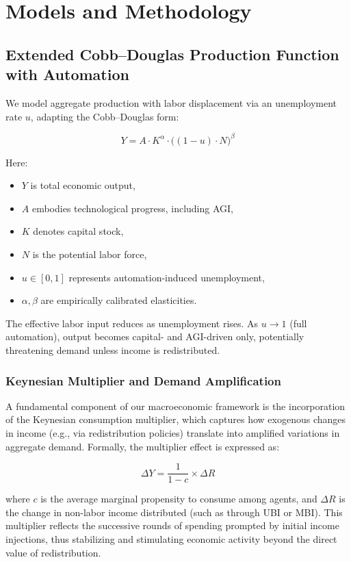 \documentclass[10pt,a4paper]{article}
\begin{document}
\section{Models and Methodology}

\subsection{Extended Cobb--Douglas Production Function with Automation}
We model aggregate production with labor displacement via an unemployment rate \(u\), adapting the Cobb--Douglas form:

\begin{equation}
Y = A \cdot K^{\alpha} \cdot \big((1 - u) \cdot N\big)^{\beta}
\end{equation}

Here:
\begin{itemize}
    \item \(Y\) is total economic output,
    \item \(A\) embodies technological progress, including AGI,
    \item \(K\) denotes capital stock,
    \item \(N\) is the potential labor force,
    \item \(u \in [0,1]\) represents automation-induced unemployment,
    \item \(\alpha, \beta\) are empirically calibrated elasticities.
\end{itemize}

The effective labor input reduces as unemployment rises. As \(u \to 1\) (full automation), output becomes capital- and AGI-driven only, potentially threatening demand unless income is redistributed.

\subsubsection{Keynesian Multiplier and Demand Amplification}
A fundamental component of our macroeconomic framework is the incorporation of the Keynesian consumption multiplier, which captures how exogenous changes in income (e.g., via redistribution policies) translate into amplified variations in aggregate demand. Formally, the multiplier effect is expressed as:

\begin{equation}
\Delta Y = \frac{1}{1 - c} \times \Delta R
\end{equation}

where \(c\) is the average marginal propensity to consume among agents, and \(\Delta R\) is the change in non-labor income distributed (such as through UBI or MBI). This multiplier reflects the successive rounds of spending prompted by initial income injections, thus stabilizing and stimulating economic activity beyond the direct value of redistribution.
\end{document}
